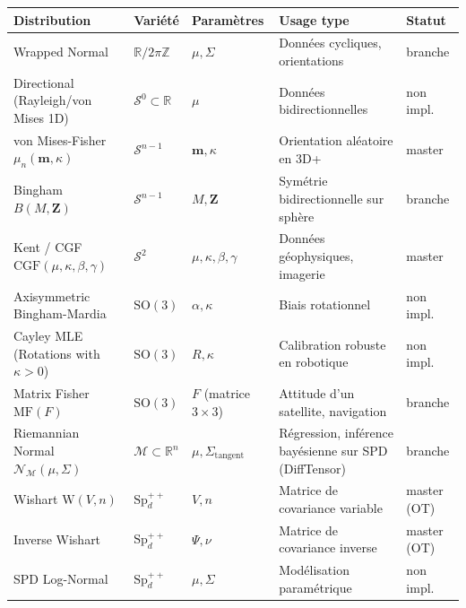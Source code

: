 \documentclass[11pt,a4paper]{article}
\begin{document}
\begin{longtable}{@{}>{\raggedright\arraybackslash}p{3.6cm}>{\raggedright\arraybackslash}p{2.4cm}>{\raggedright\arraybackslash}p{2.6cm}>{\raggedright\arraybackslash}p{4.2cm}>{\raggedright\arraybackslash}p{1.5cm}@{}}
\toprule
\textbf{Distribution} & \textbf{Variété} & \textbf{Paramètres} & \textbf{Usage type} & \textbf{Statut} \\
\midrule
\endhead
Wrapped Normal & $\mathbb{R}/2\pi\mathbb{Z}$ & $\mu, \Sigma$
    & Données cycliques, orientations
    & branche \\
Directional (Rayleigh/von Mises 1D) & $\mathcal{S}^0 \subset \mathbb{R}$ & $\mu$
    & Données bidirectionnelles
    & non impl. \\
von Mises-Fisher $\mu_n(\mathbf{m}, \kappa)$ & $\mathcal{S}^{n-1}$ & $\mathbf{m}, \kappa$
    & Orientation aléatoire en 3D+
    & master \\
Bingham $B(M, \mathbf{Z})$ & $\mathcal{S}^{n-1}$ & $M, \mathbf{Z}$
    & Symétrie bidirectionnelle sur sphère
    & branche \\
Kent / CGF $\text{CGF}(\mu, \kappa, \beta, \gamma)$ & $\mathcal{S}^2$ & $\mu, \kappa, \beta, \gamma$
    & Données géophysiques, imagerie
    & master \\
Axisymmetric Bingham-Mardia & $\text{SO}(3)$ & $\alpha, \kappa$
    & Biais rotationnel
    & non impl. \\
\midrule
Cayley MLE (Rotations with $\kappa > 0$) & $\text{SO}(3)$ & $R, \kappa$
    & Calibration robuste en robotique
    & non impl. \\
Matrix Fisher $\text{MF}(F)$ & $\text{SO}(3)$ & $F$ (matrice $3\!\times\!3$)
    & Attitude d'un satellite, navigation
    & branche \\
\midrule
Riemannian Normal $\mathcal{N}_{\mathcal{M}}(\mu, \Sigma)$ & $\mathcal{M}\!\subset\!\mathbb{R}^n$ & $\mu, \Sigma_{\text{tangent}}$
    & Régression, inférence bayésienne sur SPD (DiffTensor)
    & branche \\
Wishart $\text{W}(V, n)$ & $\text{Sp}_d^{++}$ & $V, n$
    & Matrice de covariance variable
    & master (OT) \\
Inverse Wishart & $\text{Sp}_d^{++}$ & $\Psi, \nu$
    & Matrice de covariance inverse
    & master (OT) \\
SPD Log-Normal & $\text{Sp}_d^{++}$ & $\mu, \Sigma$
    & Modélisation paramétrique
    & non impl. \\
\bottomrule
\end{longtable}
\end{document}
